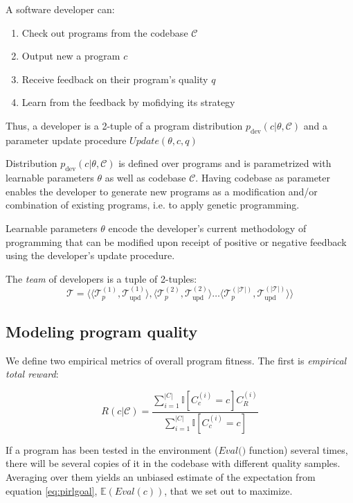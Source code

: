 A software developer can:
\begin{enumerate}
    \item Check out programs from the codebase $\mathcal{C}$
    \item Output new a program $c$
    \item Receive feedback on their program's quality $q$ 
    \item Learn from the feedback by mofidying its strategy
\end{enumerate}

Thus, a developer is a 2-tuple of a program distribution $p_\text{dev}(c | \theta, \mathcal{C})$ and a parameter update procedure $\mathit{Update}(\theta, c, q)$

Distribution $p_{\text{dev}}(c | \theta, \mathcal{C})$ is defined over programs and is parametrized with learnable parameters $\theta$ as well as codebase $\mathcal{C}$. 
Having codebase as parameter enables the developer to generate new programs as a modification and/or combination of existing programs, i.e. to apply genetic programming.

Learnable parameters $\theta$ encode the developer's current methodology of programming that can be modified upon receipt of positive or negative feedback using the developer's update procedure. 

The \emph{team} of developers is a tuple of 2-tuples:
\begin{equation}
    \mathcal{T} = \langle \langle \mathcal{T}_p^{(1)}, \mathcal{T}_\text{upd}^{(1)} \rangle, \langle \mathcal{T}_p^{(2)}, \mathcal{T}_\text{upd}^{(2)} \rangle \dots \langle \mathcal{T}_p^{(|\mathcal{T}|)}, \mathcal{T}_\text{upd}^{(|\mathcal{T}|)} \rangle \rangle
\end{equation}

\newpage \subsection{Modeling program quality}
\label{sec:quality}

We define two empirical metrics of overall program fitness.
The first is \emph{empirical total reward}:

\begin{equation}
    R(c|\mathcal{C}) = \frac{\sum\limits_{i=1}^{|C|} \mathbb{I}[C_c^{(i)}=c] C_R^{(i)}}{\sum\limits_{i=1}^{|C|} \mathbb{I}[C_c^{(i)}=c]}
\end{equation}

If a program has been tested in the environment ($\textit{Eval()}$ function) several times, there will be several copies of it in the codebase with different quality samples.
Averaging over them yields an unbiased estimate of the expectation from equation \ref{eq:pirlgoal}, $\mathbb{E}(\mathit{Eval}(c))$, that we set out to maximize.

